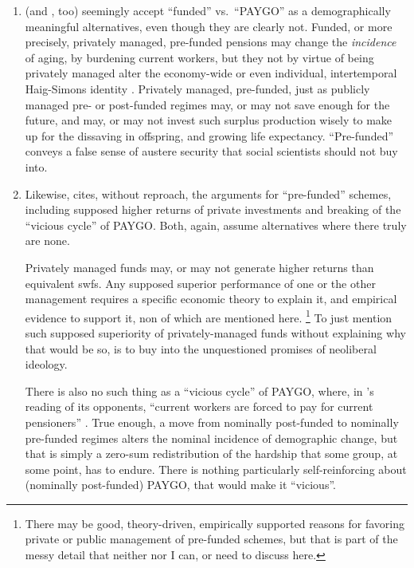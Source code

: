 \begin{enumerate}
	\item \citeauthor{Cerami2009a} (and \citealt{Bastian1998}, too) seemingly accept ``funded'' vs.\ ``PAYGO'' as a demographically meaningful alternatives, even though they are clearly not.
	Funded, or more precisely, privately managed, pre-funded pensions may change the \emph{incidence} of aging, by burdening current workers, but they not by virtue of being privately managed alter the economy-wide or even individual, intertemporal Haig-Simons identity \citep[for a detailed model, see][170]{Borsch-Supan2003}.
	Privately managed, pre-funded, just as publicly managed pre- or post-funded regimes may, or may not save enough for the future, and may, or may not invest such surplus production wisely to make up for the dissaving in offspring, and growing life expectancy.
	``Pre-funded'' conveys a false sense of austere security that social scientists should not buy into.

	\item Likewise, \citeauthor{Cerami2009a} cites, without reproach, the arguments for ``pre-funded'' schemes, including supposed higher returns of private investments and breaking of the ``vicious cycle'' of PAYGO.
	Both, again, assume alternatives where there truly are none.

	Privately managed funds may, or may not generate higher returns than equivalent \glspl{swf}.
	Any supposed superior performance of one or the other management requires a specific economic theory to explain it, and empirical evidence to support it, non of which are mentioned here.
	\footnote{
		There may be good, theory-driven, empirically supported reasons for favoring private or public management of pre-funded schemes, but that is part of the messy detail that neither \citeauthor{Cerami2009a} nor I can, or need to discuss here.
	}
	To just mention such supposed superiority of privately-managed funds without explaining why that would be so, is to buy into the unquestioned promises of neoliberal ideology.

	There is also no such thing as a ``vicious cycle'' of PAYGO, where, in \citeauthor{Cerami2009a}'s reading of its opponents, ``current workers are forced to pay for current pensioners'' \citeyearpar[339]{Cerami2009a}.
	True enough, a move from nominally post-funded to nominally pre-funded regimes alters the nominal incidence of demographic change, but that is simply a zero-sum redistribution of the hardship that some group, at some point, has to endure.
	There is nothing particularly self-reinforcing about (nominally post-funded) PAYGO, that would make it ``vicious''.


\end{enumerate}
